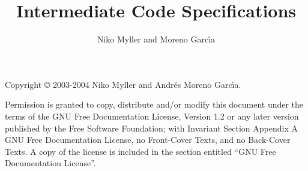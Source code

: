 \documentclass[a4paper, 12pt]{report}
\title{\jel{} Intermediate Code Specifications\\\mcode{}}
\author{Niko Myller and \andres{} Moreno Garc\'{\i}a}
\begin{document}

\maketitle
\thispagestyle{empty}

\newpage

\thispagestyle{empty} %
\vfil

Copyright \copyright{} 2003-2004  Niko Myller and Andr\'{e}s Moreno Garc\'{\i}a.
\bigskip

Permission is granted to copy, distribute and/or modify this document
under the terms of the GNU Free Documentation License, Version 1.2
or any later version published by the Free Software Foundation;
with Invariant Section Appendix A GNU Free Documentation License,
no Front-Cover Texts, and no Back-Cover Texts.
A copy of the license is included in the section entitled ``GNU Free Documentation License''.

\vfil
\newpage


\thispagestyle{empty} %

\setlength{\parskip}{0ex}

\tableofcontents
\newpage

\setlength{\parskip}{2ex}


\setcounter{page}{1}



\newpage


\newpage



\newpage






\appendix
\newpage


%
\end{document}
